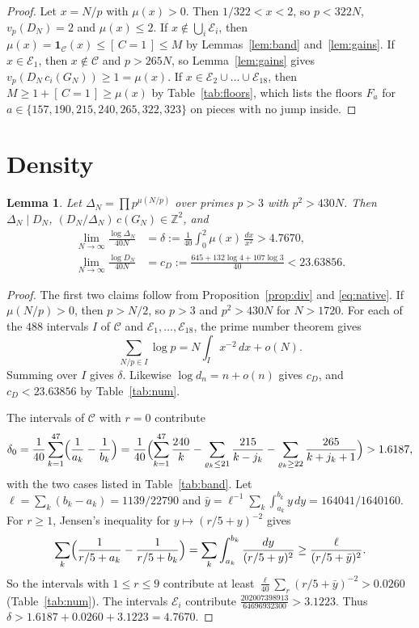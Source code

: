 \documentclass{amsart}
\newtheorem{lemma}{Lemma}[section]
\numberwithin{equation}{section}
\numberwithin{table}{section}
\newcommand{\Z}{\mathbb{Z}}
\newcommand{\br}[1]{[\,#1\,]}
\begin{document}
\begin{proof}
Let $x=N/p$ with $\mu(x)>0$. Then $1/322<x<2$, so $p<322N$, $v_p(D_N)=2$
and $\mu(x)\le2$. If $x\notin\bigcup_i\mathcal E_i$, then
$\mu(x)=\mathbf 1_{\mathcal C}(x)\le\br{C=1}\le M$ by
Lemmas~\ref{lem:band} and~\ref{lem:gains}. If $x\in\mathcal E_1$, then
$x\notin\mathcal C$ and $p>265N$, so Lemma~\ref{lem:gains} gives
$v_p(D_N\,c_i(G_N))\ge1=\mu(x)$. If $x\in\mathcal E_2\cup\dots\cup\mathcal E_{18}$,
then $M\ge1+\br{C=1}\ge\mu(x)$ by Table~\ref{tab:floors}, which lists the
floors $F_a$ for $a\in\{157,190,215,240,265,322,323\}$ on pieces with no
jump inside.
\end{proof}

\section{Density}\label{sec:dens}

\begin{lemma}\label{lem:dens}
Let $\Delta_N=\prod p^{\mu(N/p)}$ over primes $p>3$ with $p^2>430N$. Then
$\Delta_N\mid D_N$, $(D_N/\Delta_N)\,c(G_N)\in\Z^2$, and
\begin{align*}
\lim_{N\to\infty}\frac{\log\Delta_N}{40N}&=\delta:=\frac1{40}\int_0^2\mu(x)\,\frac{dx}{x^2}>4.7670,\\
\lim_{N\to\infty}\frac{\log D_N}{40N}&=c_D:=\frac{645+132\log4+107\log3}{40}<23.63856.
\end{align*}
\end{lemma}

\begin{proof}
The first two claims follow from Proposition~\ref{prop:div} and
\eqref{eq:native}. If $\mu(N/p)>0$, then $p>N/2$, so $p>3$ and $p^2>430N$
for $N>1720$. For each of the $488$ intervals $I$ of $\mathcal C$
and $\mathcal E_1,\dots,\mathcal E_{18}$, the prime number theorem gives
\[
\sum_{N/p\in I}\log p=N\int_Ix^{-2}\,dx+o(N).
\]
Summing over $I$ gives $\delta$.
Likewise $\log d_n=n+o(n)$ gives $c_D$, and $c_D<23.63856$ by
Table~\ref{tab:num}.

The intervals of $\mathcal C$ with $r=0$ contribute
\[
\delta_0=\frac1{40}\sum_{k=1}^{47}\Bigl(\frac1{a_k}-\frac1{b_k}\Bigr)
=\frac1{40}\Bigl(\sum_{k=1}^{47}\frac{240}k-\sum_{\varrho_k\le21}\frac{215}{k-j_k}
-\sum_{\varrho_k\ge22}\frac{265}{k+j_k+1}\Bigr)>1.6187,
\]
with the two cases listed in Table~\ref{tab:band}. Let
$\ell=\sum_k(b_k-a_k)=1139/22790$ and
$\bar y=\ell^{-1}\sum_k\int_{a_k}^{b_k}y\,dy=164041/1640160$. For $r\ge1$,
Jensen's inequality for $y\mapsto(r/5+y)^{-2}$ gives
\[
\sum_k\Bigl(\frac1{r/5+a_k}-\frac1{r/5+b_k}\Bigr)
=\sum_k\int_{a_k}^{b_k}\frac{dy}{(r/5+y)^2}\ge\frac{\ell}{(r/5+\bar y)^2}.
\]
So the intervals with $1\le r\le9$ contribute at least
$\frac{\ell}{40}\sum_r(r/5+\bar y)^{-2}>0.0260$ (Table~\ref{tab:num}). The intervals $\mathcal E_i$
contribute $\frac{202007398913}{64696932300}>3.1223$. Thus
$\delta>1.6187+0.0260+3.1223=4.7670$.
\end{proof}
\end{document}
